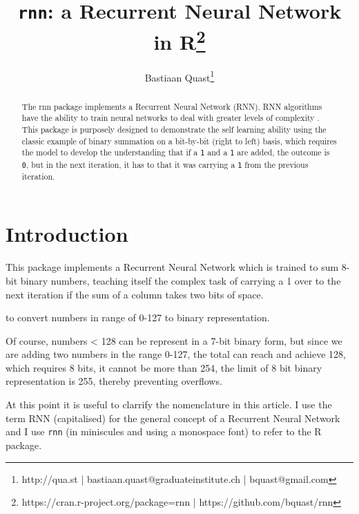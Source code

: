 \documentclass[british]{article}\usepackage[]{graphicx}\usepackage[]{color}
\newcommand{\code}[1]{\texttt{#1}}
\begin{document}
\title{\code{rnn}: a Recurrent Neural Network in R\thanks{https://cran.r-project.org/package=rnn | https://github.com/bquast/rnn}}


\author{Bastiaan Quast\thanks{http://qua.st | bastiaan.quast@graduateinstitute.ch | bquast@gmail.com}}

\maketitle
\vfill{}

\begin{abstract}
The rnn package implements a Recurrent Neural Network (RNN). RNN algorithms
have the ability to train neural networks to deal with greater levels
of complexity . This package is purposely designed to demonstrate
the self learning ability using the classic example of binary summation
on a bit-by-bit (right to left) basis, which requires the model to
develop the understanding that if a \code{1} and a \code{1} are
added, the outcome is \code{0}, but in the next iteration, it has
to that it was carrying a \code{1} from the previous iteration.
\end{abstract}
\newpage{}


\section{Introduction}

This package implements a Recurrent Neural Network which is trained
to sum 8-bit binary numbers, teaching itself the complex task of carrying
a 1 over to the next iteration if the sum of a column takes two bits
of space.

to convert numbers in range of 0-127 to binary representation.





Of course, numbers < 128 can be represent in a 7-bit binary form,
but since we are adding two numbers in the range 0-127, the total
can reach and achieve 128, which requires 8 bits, it cannot be more
than 254, the limit of 8 bit binary representation is 255, thereby
preventing overflows.

At this point it is useful to clarrify the nomenclature in this article.
I use the term RNN (capitalised) for the general concept of a Recurrent
Neural Network and I use \code{rnn} (in miniscules and using a monospace
font) to refer to the R package.
\end{document}
